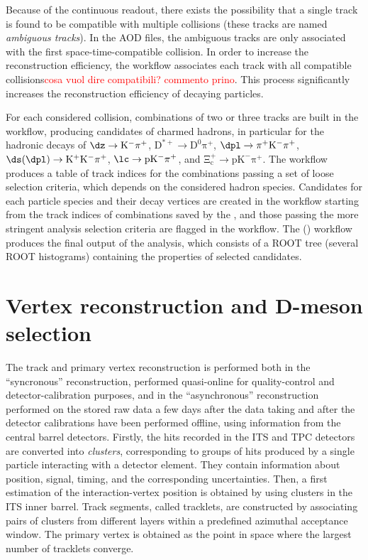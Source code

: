 Because of the continuous readout, there exists the possibility that a single track is found to be compatible with multiple collisions (these tracks are named \emph{ambiguous tracks}). In the AOD files, the ambiguous tracks are only associated with the first space-time-compatible collision. In order to increase the reconstruction efficiency, the  workflow associates each track with all compatible collisions\textcolor{red}{cosa vuol dire compatibili? commento prino}. This process significantly increases the reconstruction efficiency of decaying particles.

For each considered collision, combinations of two or three tracks are built in the  workflow, producing candidates of charmed hadrons, in particular for the hadronic decays of $\dz\rightarrow\mathrm{K^-\pi^+}$, $\mathrm{D^{*+}}\rightarrow\mathrm{D^0\pi^+}$, $\dpl\rightarrow\pi^+\mathrm{K^-}\pi^+$, \mbox{$\ds(\dpl)\rightarrow\mathrm{K^+K^-\pi^+}$}, $\lc\rightarrow\mathrm{pK^-\pi^+}$, and $\mathrm{\Xi_c^+}\rightarrow\mathrm{pK^-\pi^+}$. The workflow produces a table of track indices for the combinations passing a set of loose selection criteria, which depends on the considered hadron species. Candidates for each particle species and their decay vertices are created in the  workflow starting from the track indices of combinations saved by the , and those passing the more stringent analysis selection criteria are flagged in the  workflow. The  () workflow produces the final output of the analysis, which consists of a ROOT tree (several ROOT histograms) containing the properties of selected candidates.

\section{Vertex reconstruction and D-meson selection}

The track and primary vertex reconstruction is performed both in the ``syncronous'' reconstruction, performed quasi-online for quality-control and detector-calibration purposes, and in the ``asynchronous'' reconstruction performed on the stored raw data a few days after the data taking and after the detector calibrations have been performed offline, using information from the central barrel detectors. Firstly, the hits recorded in the ITS and TPC detectors are converted into \emph{clusters}, corresponding to groups of hits produced by a single particle interacting with a detector element. They contain information about position, signal, timing, and the corresponding uncertainties. Then, a first estimation of the interaction-vertex position is obtained by using clusters in the ITS inner barrel. Track segments, called tracklets, are constructed by associating pairs of clusters from different layers within a predefined azimuthal acceptance window. The primary vertex is obtained as the point in space where the largest number of tracklets converge. 

